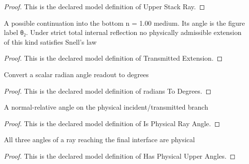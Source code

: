 \begin{proof}
  This is the declared model definition of Upper Stack Ray.
\end{proof}
\begin{definition}
  \label{def:physics:phyx-mini-0021:phyxminiproblems-problemphyxmini0021-transmittedextension}
  A possible continuation into the bottom n = 1.00 medium. Its angle is the figure label θ₂. Under strict total internal reflection no physically admissible extension of this kind satisfies Snell's law
\end{definition}
\begin{proof}
  This is the declared model definition of Transmitted Extension.
\end{proof}
\begin{definition}
  \label{def:physics:phyx-mini-0021:phyxminiproblems-problemphyxmini0021-radianstodegrees}
  Convert a scalar radian angle readout to degrees
\end{definition}
\begin{proof}
  This is the declared model definition of radians To Degrees.
\end{proof}
\begin{definition}
  \label{def:physics:phyx-mini-0021:phyxminiproblems-problemphyxmini0021-isphysicalrayangle}
  A normal-relative angle on the physical incident/transmitted branch
\end{definition}
\begin{proof}
  This is the declared model definition of Is Physical Ray Angle.
\end{proof}
\begin{definition}
  \label{def:physics:phyx-mini-0021:phyxminiproblems-problemphyxmini0021-hasphysicalupperangles}
  All three angles of a ray reaching the final interface are physical
\end{definition}
\begin{proof}
  This is the declared model definition of Has Physical Upper Angles.
\end{proof}
